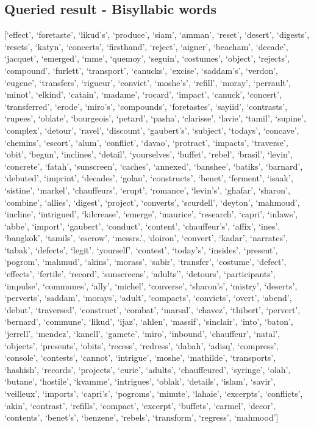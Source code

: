\documentclass[a4paper]{article}
\begin{document}
\subsection{Queried result - Bisyllabic words}
\label{appendix:a}
[`effect', `foretaste', `likud's', `produce', `siam', `amman', `reset', `desert', `digests', `resets', `katyn', `concerts', `firsthand', `reject', `aigner', `beacham', `decade', `jacquet', `emerged', `mme', `quemoy', `seguin', `costumes', `object', `rejects', `compound', `furlett', `transport', `canucks', `excise', `saddam's', `verdon', `eugene', `transfers', `rigueur', `convict', `moshe's', `refill', `moray', `perrault', `minot', `elkind', `catain', `madame', `rocard', `impact', `canuck', `concert', `transferred', `erode', `miro's', `compounds', `foretastes', `sayiid', `contrasts', `rupees', `oblate', `bourgeois', `petard', `pasha', `clarisse', `lavie', `tamil', `supine', `complex', `detour', `ravel', `discount', `gaubert's', `subject', `todays', `concave', `chemins', `escort', `alum', `conflict', `davao', `protract', `impacts', `traverse', `obit', `begun', `inclines', `detail', `yourselves', `buffet', `rebel', `brasil', `levin', `concrete', `fatah', `sunscreen', `caches', `annexed', `banshee', `batiks', `barnard', `debuted', `imprint', `decades', `golan', `constructs', `benet', `ferment', `isaak', `sistine', `markel', `chauffeurs', `erupt', `romance', `levin's', `ghafar', `sharon', `combine', `allies', `digest', `project', `converts', `scurdell', `deyton', `mahmoud', `incline', `intrigued', `kilcrease', `emerge', `maurice', `research', `capri', `inlaws', `abbe', `import', `gaubert', `conduct', `content', `chauffeur's', `affix', `ines', `bangkok', `tamils', `escrow', `messrs.', `doiron', `convert', `kadar', `narrates', `tabak', `defects', `legit', `yourself', `contest', `today's', `insides', `present', `pogrom', `mahmud', `akins', `morass', `sabir', `transfer', `costume', `defect', `effects', `fertile', `record', `sunscreens', `adults'', `detours', `participants', `impulse', `communes', `ally', `michel', `converse', `sharon's', `mistry', `deserts', `perverts', `saddam', `morays', `adult', `compacts', `convicts', `overt', `abend', `debut', `traversed', `construct', `combat', `marsal', `chavez', `thibert', `pervert', `bernard', `commune', `likud', `ijaz', `ahlen', `massif', `sinclair', `into', `baton', `jerrell', `mendez', `kanell', `gamete', `miro', `inbound', `chauffeur', `natal', `objects', `presents', `obits', `recess', `redress', `dabah', `adisq', `compress', `console', `contests', `cannot', `intrigue', `moshe', `mathilde', `transports', `hashish', `records', `projects', `curie', `adults', `chauffeured', `syringe', `olah', `butane', `hostile', `kvamme', `intrigues', `oblak', `details', `islam', `savir', `veilleux', `imports', `capri's', `pogroms', `minute', `lahaie', `excerpts', `conflicts', `akin', `contrast', `refills', `compact', `excerpt', `buffets', `carmel', `decor', `contents', `benet's', `benzene', `rebels', `transform', `regress', ‘mahmood’]
\end{document}
